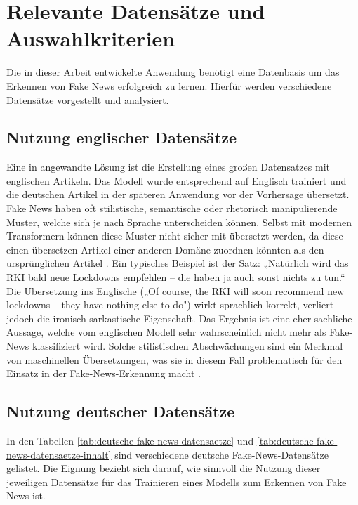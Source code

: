 \chapter{Relevante Datensätze und Auswahlkriterien}
\label{chap:relevante_datensaetze_und_auswahlkriterien}

Die in dieser Arbeit entwickelte Anwendung benötigt eine Datenbasis um das Erkennen von Fake News erfolgreich zu lernen.
Hierfür werden verschiedene Datensätze vorgestellt und analysiert.

\section{Nutzung englischer Datensätze} \label{sec:english_datasets}

Eine in \cite{Simone2022} angewandte Lösung ist die Erstellung eines großen Datensatzes mit englischen Artikeln. Das Modell wurde entsprechend auf Englisch 
trainiert und die deutschen Artikel in der späteren Anwendung vor der Vorhersage übersetzt.
Fake News haben oft stilistische, semantische oder rhetorisch manipulierende Muster, welche sich je nach Sprache unterscheiden können.
Selbst mit modernen Transformern können diese Muster nicht sicher mit übersetzt werden, da diese einen übersetzen Artikel einer anderen Domäne zuordnen könnten
als den ursprünglichen Artikel \cite{hong2023disentanglingstructurestylepolitical}. 
Ein typisches Beispiel ist der Satz: „Natürlich wird das RKI bald neue Lockdowns empfehlen – die haben ja auch sonst nichts zu tun.“ 
Die Übersetzung ins Englische („Of course, the RKI will soon recommend new lockdowns – they have nothing else to do") wirkt sprachlich korrekt, 
verliert jedoch die ironisch-sarkastische Eigenschaft.
Das Ergebnis ist eine eher sachliche Aussage, welche vom englischen Modell sehr wahrscheinlich nicht mehr als Fake-News klassifiziert wird.
Solche stilistischen Abschwächungen sind ein Merkmal von maschinellen Übersetzungen, was sie in diesem Fall problematisch
für den Einsatz in der Fake-News-Erkennung macht \cite{kuehn2024enhancingrhetoricalfigureannotation}.

\section{Nutzung deutscher Datensätze}
\label{sec:auswahl_und_begruendung_finaler_datensatz}

In den Tabellen \ref{tab:deutsche-fake-news-datensaetze} und \ref{tab:deutsche-fake-news-datensaetze-inhalt} sind verschiedene deutsche Fake-News-Datensätze gelistet.
Die Eignung bezieht sich darauf, wie sinnvoll die Nutzung dieser jeweiligen Datensätze für das Trainieren eines Modells zum Erkennen von Fake News ist.

